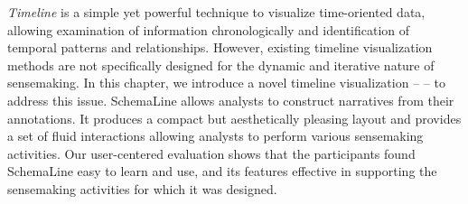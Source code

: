 \emph{Timeline} is a simple yet powerful technique to visualize time-oriented data, allowing examination of information chronologically and identification of temporal patterns and relationships. However, existing timeline visualization methods are not specifically designed for the dynamic and iterative nature of sensemaking. In this chapter, we introduce a novel timeline visualization -- \emph{} -- to address this issue. SchemaLine allows analysts to construct narratives from their annotations. It produces a compact but aesthetically pleasing layout and provides a set of fluid interactions allowing analysts to perform various sensemaking activities. Our user-centered evaluation shows that the participants found SchemaLine easy to learn and use, and its features effective in supporting the sensemaking activities for which it was designed.






